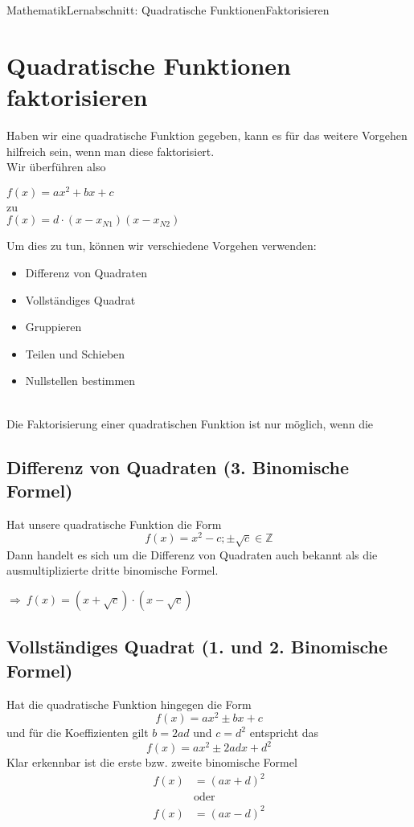 \documentclass[11pt,twocolumn,oneside,openany,headings=optiontotoc,11pt,numbers=noenddot]{article}
\begin{document}
	\begin{worksheet}{Mathematik}{Lernabschnitt: Quadratische Funktionen}{Faktorisieren}
		\setcounter{section}{1}
		\section{Quadratische Funktionen faktorisieren}
		Haben wir eine quadratische Funktion gegeben, kann es für das weitere Vorgehen hilfreich sein, wenn man diese faktorisiert.\\
		Wir überführen also
		\begin{center}
			\colorbox{red!10}{\(f(x) = ax^2 +bx + c \)}\\
			zu\\
			\colorbox{green!10}{\(f(x) = d\cdot(x - x_{N1})(x-x_{N2})\)}
		\end{center}
		Um dies zu tun, können wir verschiedene Vorgehen verwenden:
		\begin{itemize}
			\item Differenz von Quadraten
			\item Vollständiges Quadrat
			\item Gruppieren
			\item Teilen und Schieben
			\item Nullstellen bestimmen
		\end{itemize}
		\begin{framed}
			\noindent
			\normalcolor\\
			Die Faktorisierung einer quadratischen Funktion ist nur möglich, wenn die 
		\end{framed}
		\subsection{Differenz von Quadraten (3. Binomische Formel)}
		Hat unsere quadratische Funktion die Form \[f(x) = x^2 - c; \pm\sqrt{c}\in \mathbb{Z}\]
		Dann handelt es sich um die Differenz von Quadraten auch bekannt als die ausmultiplizierte dritte binomische Formel.\\
		\par\noindent
		\(\Rightarrow\ f(x) = (x+\sqrt{c})\cdot(x-\sqrt{c})\)
		\subsection{Vollständiges Quadrat (1. und 2. Binomische Formel)}
		Hat die quadratische Funktion hingegen die Form \[f(x) = ax^2 \pm bx + c\] und  für die Koeffizienten gilt \(b = 2ad\) und \(c = d^2\) entspricht das \[f(x) = ax^2 \pm 2adx + d^2\]
		Klar erkennbar ist die erste bzw. zweite binomische Formel
		\begin{align*}
			f(x) & = (ax+d)^2\\
			&\text{oder}\\
			f(x) & = (ax-d)^2
		\end{align*}

\end{worksheet}
\end{document}
